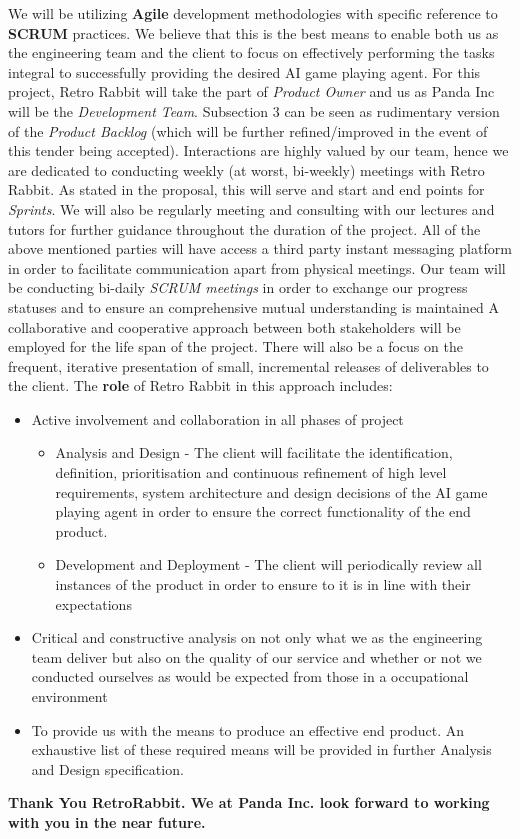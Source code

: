 \documentclass[11pt]{article}
\begin{document}
We will be utilizing \textbf{Agile} development methodologies with specific reference to \textbf{SCRUM} practices. We believe that this is the best means to enable both us as the engineering team and the client to focus on effectively performing the tasks integral to successfully providing the desired AI game playing agent. 
For this project, Retro Rabbit will take the part of \emph{Product Owner} and us as Panda Inc will be the \emph{Development Team}. Subsection 3 can be seen as rudimentary version of the \emph{Product Backlog} (which will be further refined/improved in the event of this tender being accepted).
\newline \newline
Interactions are highly valued by our team, hence we are dedicated to conducting weekly (at worst, bi-weekly) meetings with Retro Rabbit. As stated in the proposal, this will serve and start and end points for \emph{Sprints}. We will also be regularly meeting and consulting with our lectures and tutors for further guidance throughout the duration of the project. All of the above mentioned parties will have access a third party instant messaging platform in order to facilitate communication apart from physical meetings. Our team will be conducting bi-daily \emph{SCRUM meetings} in order to exchange our progress statuses and to ensure an comprehensive mutual understanding is maintained
\newline \newline
A collaborative and cooperative approach between both stakeholders will be employed for the life span of the project. There will also be a focus on the frequent, iterative presentation of small, incremental releases of deliverables to the client. The \textbf{role} of Retro Rabbit in this approach includes:
\begin{itemize}
\item Active involvement and collaboration in all phases of project
  \begin{itemize}
  \item Analysis and Design - The client will facilitate the identification, definition, prioritisation and continuous refinement of high level requirements, system architecture and design decisions of the AI game playing agent in order to ensure the correct functionality of the end product.
  \item Development and Deployment - The client will periodically review all instances of the product in order to ensure to it is in line with their expectations 
  \end{itemize}
\item Critical and constructive analysis on not only what we as the engineering team deliver but also on the quality of our service and whether or not we conducted ourselves as would be expected from those in a occupational environment
\item To provide us with the means to produce an effective end product. An exhaustive list of these required means will be provided in further Analysis and Design specification.
  
\end{itemize}

\begin{center}
{\sffamily\bfseries
\large Thank You RetroRabbit. We at Panda Inc. look forward to working with you in the near future.
}
\end{center}
\end{document}
